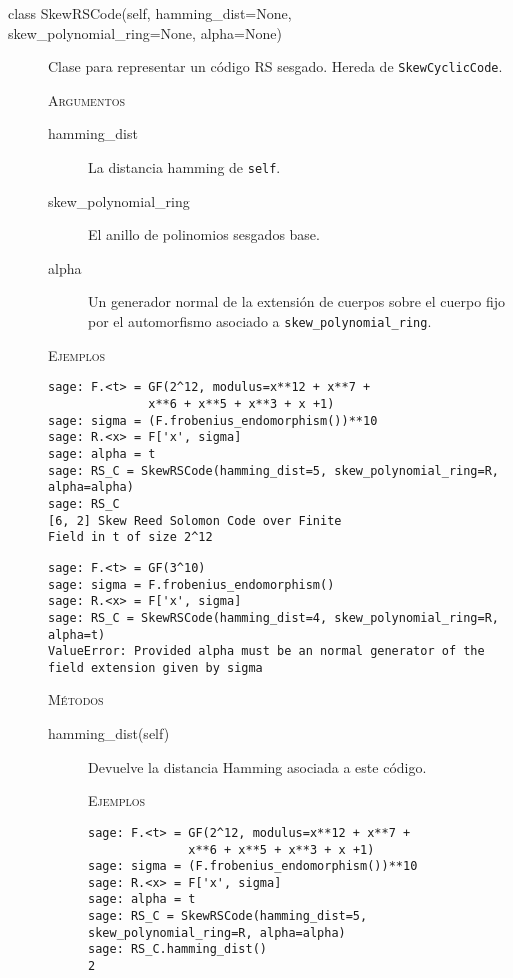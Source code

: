 \begin{description}
    \item[class SkewRSCode(self, hamming\_dist=None, \\skew\_polynomial\_ring=None, alpha=None)]

    Clase para representar un código RS sesgado. Hereda de \texttt{SkewCyclicCode}.

    \textsc{Argumentos}
    \begin{description}
        \item[hamming\_dist] La distancia hamming de \texttt{self}.
        \item[skew\_polynomial\_ring] El anillo de polinomios sesgados base.
        \item[alpha] Un generador normal de la extensión de cuerpos sobre el cuerpo fijo por el automorfismo asociado a \texttt{skew\_polynomial\_ring}.
    \end{description}

    \textsc{Ejemplos}
    \begin{lstlisting}
sage: F.<t> = GF(2^12, modulus=x**12 + x**7 +
              x**6 + x**5 + x**3 + x +1)
sage: sigma = (F.frobenius_endomorphism())**10
sage: R.<x> = F['x', sigma]
sage: alpha = t
sage: RS_C = SkewRSCode(hamming_dist=5, skew_polynomial_ring=R, alpha=alpha)
sage: RS_C
[6, 2] Skew Reed Solomon Code over Finite
Field in t of size 2^12
    \end{lstlisting}

    \begin{lstlisting}
sage: F.<t> = GF(3^10)
sage: sigma = F.frobenius_endomorphism()
sage: R.<x> = F['x', sigma]
sage: RS_C = SkewRSCode(hamming_dist=4, skew_polynomial_ring=R, alpha=t)
ValueError: Provided alpha must be an normal generator of the field extension given by sigma
\end{lstlisting}

    \textsc{Métodos}
    \begin{description}
        \item[hamming\_dist(self)]
            Devuelve la distancia Hamming asociada a este código.

        \textsc{Ejemplos}
        \begin{lstlisting}
sage: F.<t> = GF(2^12, modulus=x**12 + x**7 +
              x**6 + x**5 + x**3 + x +1)
sage: sigma = (F.frobenius_endomorphism())**10
sage: R.<x> = F['x', sigma]
sage: alpha = t
sage: RS_C = SkewRSCode(hamming_dist=5, skew_polynomial_ring=R, alpha=alpha)
sage: RS_C.hamming_dist()
2
        \end{lstlisting}
    \end{description}
\end{description}

